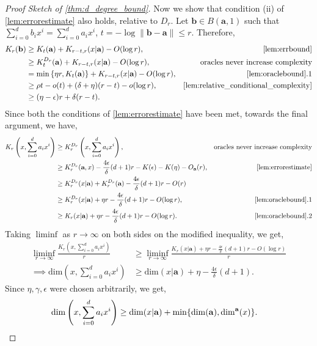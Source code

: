 \documentclass[a4paper,UKenglish,cleveref,autoref,thm-restate]{lipics-v2021}
\renewcommand{\dim}{{\mathrm{dim}}}
\begin{document}
\begin{proof}[Proof Sketch of \cref{thm:d_degree_bound}]
Now we show that condition (ii) of \cref{lem:errorestimate} also
holds, relative to $D_r$. Let $\textbf{b} \in B(\textbf{a},1)$ such
that $\sum_{i=0}^d b_i x^i = \sum_{i=0}^d a_i x^i$, $t = -\log
\|\textbf{b}-\textbf{a}\| \le r$. Therefore, 
\begin{align*}
K_r(\textbf{b})&\geq
K_t(\textbf{a})+K_{r-t,r}(x|\textbf{a})-O(\log r),&\cref{lem:errbound}\\
&\geq K_t^{D_r}(\textbf{a})+K_{r-t,r}(x|\textbf{a})-O(\log r),&\text{oracles never increase complexity}\\
&=\min\left\{\eta r,K_t(\textbf{a})\right\}+K_{r-t,r}(x|\textbf{a})-O(\log r),&\cref{lem:oraclebound}.1\\
&\geq\rho t-o(t)+(\delta+\eta)(r-t)-o(\log r),&\cref{lem:relative_conditional_complexity}\\
&\geq(\eta-\epsilon)r+\delta(r-t).
\end{align*}
Since both the conditions of \cref{lem:errorestimate} have been met, towards the final argument, we have, 
\begin{align*}
K_r\left(x,\sum_{i=0}^da_ix^i\right)&\geq K_r^{D_r}\left(x,\sum_{i=0}^da_ix^i\right),&\text{oracles never increase complexity}\\
&\geq K_r^{D_r}(\textbf{a},x)-\frac{4\epsilon}{\delta}(d+1)r-K(\epsilon)-K(\eta)-O_\textbf{a}(r),&\cref{lem:errorestimate}\\
&\geq K_r^{D_r}(x|\textbf{a})+K_r^{D_r}(\textbf{a})-\frac{4\epsilon}{\delta}(d+1)r-O(r)\\
&\geq K_r^{D_r}(x|\textbf{a})+\eta
  r-\frac{4\epsilon}{\delta}(d+1)r-O(\log r),&\cref{lem:oraclebound}.1\\
&\geq K_r(x|\textbf{a})+\eta r-\frac{4\epsilon}{\delta}(d+1)r-O(\log r).&\cref{lem:oraclebound}.2
\end{align*}
Taking $\liminf$ as $r\rightarrow\infty$ on both sides on the modified inequality, we get, 
\begin{align*}
\liminf_{r\rightarrow\infty}\frac{K_r\left(x,\sum_{i=0}^da_ix^i\right)}{r}&\geq\liminf_{r\rightarrow\infty}\frac{K_r(x|\mathbf{a})+\eta r-\frac{4\epsilon}{\delta}(d+1)r-O(\log r)}{r}\\
\implies\dim\left(x,\sum_{i=0}^da_ix^i\right)&\geq\dim(x|\mathbf{a})+\eta-\frac{4\epsilon}{\delta}(d+1). 
\end{align*}
Since $\eta,\gamma,\epsilon$ were chosen arbitrarily, we get, 
\begin{align*}
\dim\left(x,\sum_{i=0}^da_ix^i\right)&\geq\dim(x|\mathbf{a})+\min\{\dim(\mathbf{a}),\dim^\mathbf{a}(x)\}.\qedhere
\end{align*}
\end{proof}
\end{document}
